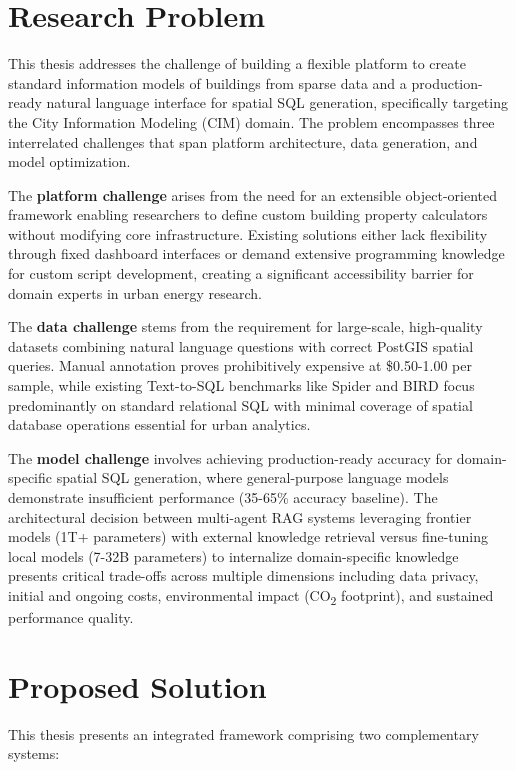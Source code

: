 \section{Research Problem}

This thesis addresses the challenge of building a flexible platform to create standard information models of buildings from sparse data and a production-ready natural language interface for spatial SQL generation, specifically targeting the City Information Modeling (CIM) domain. The problem encompasses three interrelated challenges that span platform architecture, data generation, and model optimization.

The \textbf{platform challenge} arises from the need for an extensible object-oriented framework enabling researchers to define custom building property calculators without modifying core infrastructure. Existing solutions either lack flexibility through fixed dashboard interfaces or demand extensive programming knowledge for custom script development, creating a significant accessibility barrier for domain experts in urban energy research.

The \textbf{data challenge} stems from the requirement for large-scale, high-quality datasets combining natural language questions with correct PostGIS spatial queries. Manual annotation proves prohibitively expensive at \$0.50-1.00 per sample, while existing Text-to-SQL benchmarks like Spider and BIRD focus predominantly on standard relational SQL with minimal coverage of spatial database operations essential for urban analytics.

The \textbf{model challenge} involves achieving production-ready accuracy for domain-specific spatial SQL generation, where general-purpose language models demonstrate insufficient performance (35-65\% accuracy baseline). The architectural decision between multi-agent RAG systems leveraging frontier models (1T+ parameters) with external knowledge retrieval versus fine-tuning local models (7-32B parameters) to internalize domain-specific knowledge presents critical trade-offs across multiple dimensions including data privacy, initial and ongoing costs, environmental impact (CO\textsubscript{2} footprint), and sustained performance quality.

\section{Proposed Solution}

This thesis presents an integrated framework comprising two complementary systems:

